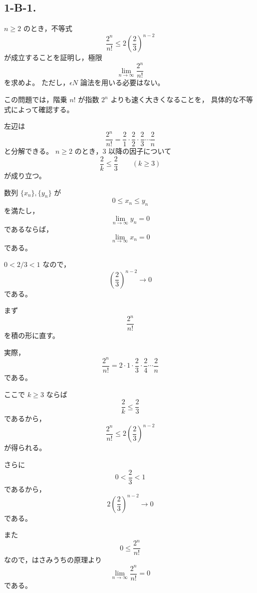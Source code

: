\subsection{1-B-1.}
\begin{exercise}
	$n\geq 2$ のとき，不等式
	\[
		\frac{2^n}{n!}\leq 2\left(\frac{2}{3}\right)^{n-2}
	\]
	が成立することを証明し，極限
	\[
		\lim_{n\to\infty}\frac{2^n}{n!}
	\]
	を求めよ。
	ただし，$\epsilon N$ 論法を用いる必要はない。
\end{exercise}
\begin{background}
	この問題では，階乗 $n!$ が指数 $2^n$ よりも速く大きくなることを，
	具体的な不等式によって確認する。

	\begin{remark}
		左辺は
		\[
			\frac{2^n}{n!}
			=
			\frac{2}{1}\cdot\frac{2}{2}\cdot\frac{2}{3}
			\cdots\frac{2}{n}
		\]
		と分解できる。
		$n\geq 2$ のとき，$3$ 以降の因子について
		\[
			\frac{2}{k}\leq \frac{2}{3}
			\qquad (k\geq 3)
		\]
		が成り立つ。
	\end{remark}

	\begin{lemma}[はさみうちの原理]
		数列 $\{x_n\},\{y_n\}$ が
		\[
			0\leq x_n\leq y_n
		\]
		を満たし，
		\[
			\lim_{n\to\infty}y_n=0
		\]
		であるならば，
		\[
			\lim_{n\to\infty}x_n=0
		\]
		である。
	\end{lemma}

	\begin{remark}
		$0<2/3<1$ なので，
		\[
			\left(\frac{2}{3}\right)^{n-2}\to 0
		\]
		である。
	\end{remark}
\end{background}
\begin{strategy}
	まず
	\[
		\frac{2^n}{n!}
	\]
	を積の形に直す。

	実際，
	\[
		\frac{2^n}{n!}
		=
		2\cdot 1\cdot
		\frac{2}{3}\cdot\frac{2}{4}
		\cdots
		\frac{2}{n}
	\]
	である。

	ここで $k\geq 3$ ならば
	\[
		\frac{2}{k}\leq\frac{2}{3}
	\]
	であるから，
	\[
		\frac{2^n}{n!}
		\leq
		2\left(\frac{2}{3}\right)^{n-2}
	\]
	が得られる。

	さらに
	\[
		0<\frac{2}{3}<1
	\]
	であるから，
	\[
		2\left(\frac{2}{3}\right)^{n-2}\to 0
	\]
	である。

	また
	\[
		0\leq \frac{2^n}{n!}
	\]
	なので，はさみうちの原理より
	\[
		\lim_{n\to\infty}\frac{2^n}{n!}=0
	\]
	である。
\end{strategy}
